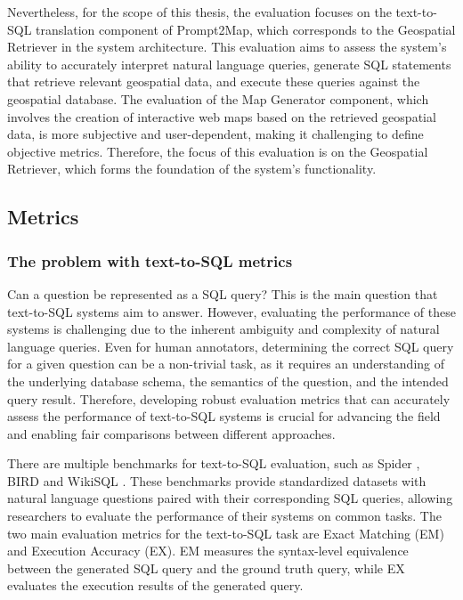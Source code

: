 Nevertheless, for the scope of this thesis, the evaluation focuses on the text-to-SQL translation component of Prompt2Map, which corresponds to the Geospatial Retriever in the system architecture. This evaluation aims to assess the system's ability to accurately interpret natural language queries, generate SQL statements that retrieve relevant geospatial data, and execute these queries against the geospatial database. The evaluation of the Map Generator component, which involves the creation of interactive web maps based on the retrieved geospatial data, is more subjective and user-dependent, making it challenging to define objective metrics. Therefore, the focus of this evaluation is on the Geospatial Retriever, which forms the foundation of the system's functionality.

\subsection{Metrics}

\subsubsection{The problem with text-to-SQL metrics}

Can a question be represented as a SQL query? This is the main question that text-to-SQL systems aim to answer. However, evaluating the performance of these systems is challenging due to the inherent ambiguity and complexity of natural language queries. Even for human annotators, determining the correct SQL query for a given question can be a non-trivial task, as it requires an understanding of the underlying database schema, the semantics of the question, and the intended query result. Therefore, developing robust evaluation metrics that can accurately assess the performance of text-to-SQL systems is crucial for advancing the field and enabling fair comparisons between different approaches.

There are multiple benchmarks for text-to-SQL evaluation, such as Spider \cite{yu_spider_2018}, BIRD \cite{li_can_2023} and WikiSQL \cite{zhongSeq2SQL2017}. These benchmarks provide standardized datasets with natural language questions paired with their corresponding SQL queries, allowing researchers to evaluate the performance of their systems on common tasks. The two main evaluation metrics for the text-to-SQL task are Exact Matching (EM) and Execution Accuracy (EX). EM measures the syntax-level equivalence between the generated SQL query and the ground truth query, while EX evaluates the execution results of the generated query.

